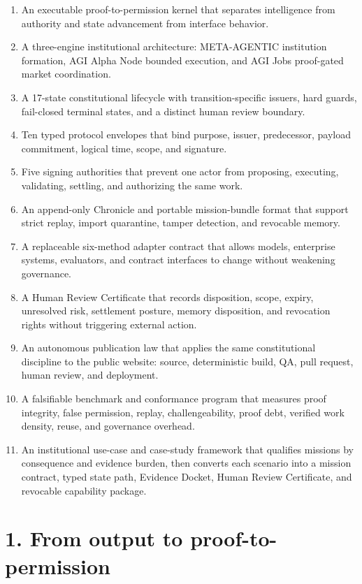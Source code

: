 \begin{enumerate}
\def\labelenumi{\arabic{enumi}.}
\item
  An executable proof-to-permission kernel that separates intelligence
  from authority and state advancement from interface behavior.
\item
  A three-engine institutional architecture: META-AGENTIC institution
  formation, AGI Alpha Node bounded execution, and AGI Jobs proof-gated
  market coordination.
\item
  A 17-state constitutional lifecycle with transition-specific issuers,
  hard guards, fail-closed terminal states, and a distinct human review
  boundary.
\item
  Ten typed protocol envelopes that bind purpose, issuer, predecessor,
  payload commitment, logical time, scope, and signature.
\item
  Five signing authorities that prevent one actor from proposing,
  executing, validating, settling, and authorizing the same work.
\item
  An append-only Chronicle and portable mission-bundle format that
  support strict replay, import quarantine, tamper detection, and
  revocable memory.
\item
  A replaceable six-method adapter contract that allows models,
  enterprise systems, evaluators, and contract interfaces to change
  without weakening governance.
\item
  A Human Review Certificate that records disposition, scope, expiry,
  unresolved risk, settlement posture, memory disposition, and
  revocation rights without triggering external action.
\item
  An autonomous publication law that applies the same constitutional
  discipline to the public website: source, deterministic build, QA,
  pull request, human review, and deployment.
\item
  A falsifiable benchmark and conformance program that measures proof
  integrity, false permission, replay, challengeability, proof debt,
  verified work density, reuse, and governance overhead.
\item
  An institutional use-case and case-study framework that qualifies
  missions by consequence and evidence burden, then converts each
  scenario into a mission contract, typed state path, Evidence Docket,
  Human Review Certificate, and revocable capability package.
\end{enumerate}

\section{1. From output to
proof-to-permission}\label{from-output-to-proof-to-permission}

